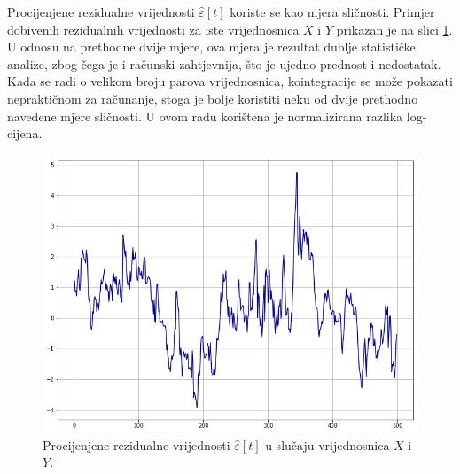 \documentclass[lmodern, utf8, diplomski, numeric]{fer}
\newcommand{\q}{\left}
\newcommand{\w}{\right}
\begin{document}
  Procijenjene rezidualne vrijednosti $\hat{\varepsilon}\q[t\w]$ koriste se kao mjera sličnosti.
  Primjer dobivenih rezidualnih vrijednosti za iste vrijednosnica $X$ i $Y$ prikazan je na slici \ref{fig:residual}.
  U odnosu na prethodne dvije mjere, ova mjera je rezultat dublje statističke analize, zbog čega je i računski zahtjevnija, što je ujedno prednost i nedostatak.
  Kada se radi o velikom broju parova vrijednosnica, kointegracije se može pokazati nepraktičnom za računanje, stoga je bolje koristiti neku od dvije prethodno navedene mjere sličnosti.
  U ovom radu korištena je normalizirana razlika log-cijena.
  
  \begin{figure}[H]
    \centering
    \includegraphics[width=1.0\linewidth]{graphics/diff-norm.png}
    \caption{
      Procijenjene rezidualne vrijednosti $\hat{\varepsilon}\q[t\w]$ u slučaju vrijednosnica $X$ i $Y$.}
    \label{fig:residual}
  \end{figure}
  
\end{document}
